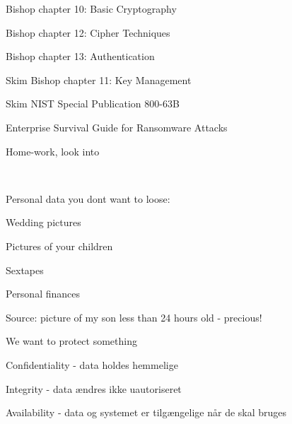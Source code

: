 \documentclass[Screen16to9,17pt]{foils}
\begin{document}

\begin{list1}
\item
\item Bishop chapter 10: Basic Cryptography
\item Bishop chapter 12: Cipher Techniques
\item Bishop chapter 13: Authentication
\item Skim Bishop chapter 11: Key Management
\item Skim NIST Special Publication 800-63B
\item Enterprise Survival Guide for Ransomware Attacks
\end{list1}

Home-work, look into {\small  {}}










{~}

\begin{list1}
\item Personal data you dont want to loose:
\begin{list2}
\item Wedding pictures
\item Pictures of your children
\item Sextapes
\item Personal finances
\end{list2}
\end{list1}

Source: picture of my son less than 24 hours old - precious!




\begin{list1}
\item We want to protect something
\item Confidentiality - data holdes hemmelige
\item Integrity - data ændres ikke uautoriseret
\item Availability - data og systemet er tilgængelige når de skal bruges
\end{list1}
\end{document}
